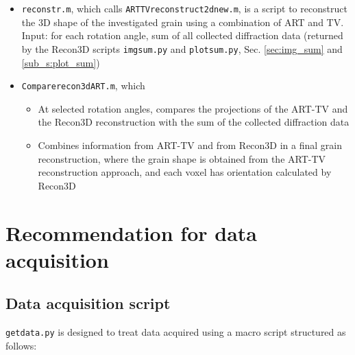 \documentclass[11pt]{scrartcl}
\begin{document}
\begin{itemize}
    \item {\texttt{reconstr.m}}, which calls {\texttt{ART\textunderscore TV\textunderscore reconstruct\textunderscore 2d\textunderscore new.m}}, is a script to reconstruct the 3D shape of the investigated grain using a combination of {\footnotesize{ART}} and {\footnotesize{TV}}. Input: for each rotation angle, sum of all collected diffraction data (returned by the Recon3D scripts {\texttt{img\textunderscore sum.py}} and {\texttt{plot\textunderscore sum.py}}, Sec. \ref{sec:img_sum} and \ref{sub_s:plot_sum})
    \item {\texttt{Compare\textunderscore recon3d\textunderscore ART.m}}, which
    \begin{itemize}
        \item At selected rotation angles, compares the projections of the {\footnotesize{ART-TV}} and the Recon3D reconstruction with the sum of the collected diffraction data
        \item Combines information from {\footnotesize{ART-TV}} and from Recon3D in a final grain reconstruction, where the grain shape is obtained from the {\footnotesize{ART-TV}} reconstruction approach, and each voxel has orientation calculated by Recon3D
    \end{itemize}
\end{itemize}

\section{Recommendation for data acquisition}\label{sec:data_acquisition}

\subsection{Data acquisition script}

{\texttt{getdata.py}} is designed to treat data acquired using a macro script structured as follows:
\end{document}
